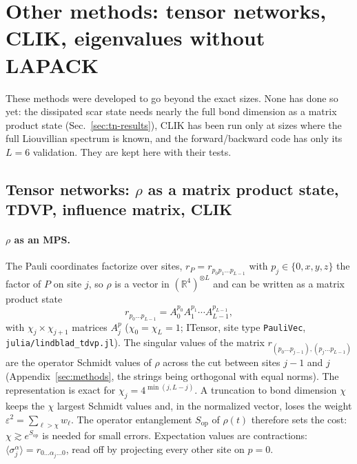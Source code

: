 \section{Other methods: tensor networks, CLIK, eigenvalues without LAPACK}
\label{app:other}

These methods were developed to go beyond the exact sizes. None has done so yet: the dissipated scar state needs nearly the full bond dimension as a matrix product state (Sec.~\ref{sec:tn-results}), CLIK has been run only at sizes where the full Liouvillian spectrum is known, and the forward/backward code has only its $L = 6$ validation. They are kept here with their tests.

\subsection{Tensor networks: $\rho$ as a matrix product state, TDVP, influence matrix, CLIK}
\label{sec:tn}

\paragraph{$\rho$ as an MPS.} The Pauli coordinates factorize over sites, $r_P = r_{p_0p_1\dots p_{L-1}}$ with $p_j \in \{0, x, y, z\}$ the factor of $P$ on site $j$, so $\rho$ is a vector in $(\mathbb R^4)^{\otimes L}$ and can be written as a matrix product state
\begin{equation}
r_{p_0\dots p_{L-1}} = A_0^{p_0}A_1^{p_1}\cdots A_{L-1}^{p_{L-1}},
\end{equation}
with $\chi_{j}\times\chi_{j+1}$ matrices $A_j^{p}$ ($\chi_0 = \chi_L = 1$; ITensor, site type \texttt{PauliVec}, \texttt{julia/lindblad\_tdvp.jl}). The singular values of the matrix $r_{(p_0\dots p_{j-1}),(p_j\dots p_{L-1})}$ are the operator Schmidt values of $\rho$ across the cut between sites $j-1$ and $j$ (Appendix~\ref{sec:methods}, the strings being orthogonal with equal norms). The representation is exact for $\chi_j = 4^{\min(j, L-j)}$. A truncation to bond dimension $\chi$ keeps the $\chi$ largest Schmidt values and, in the normalized vector, loses the weight $\varepsilon^2 = \sum_{\ell>\chi}w_\ell$. The operator entanglement $S_{\mathrm{op}}$ of $\rho(t)$ therefore sets the cost: $\chi \gtrsim e^{S_{\mathrm{op}}}$ is needed for small errors. Expectation values are contractions: $\langle\sigma^\alpha_j\rangle = r_{0\dots\alpha_j\dots0}$, read off by projecting every other site on $p = 0$.

